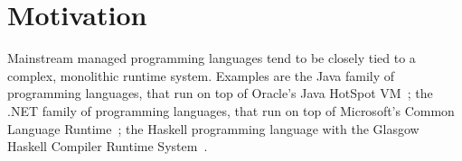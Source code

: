 \documentclass[12pt,mscres,cdtppar,twoside,openright,logo,rightchapter,normalheadings]{infthesis}
\theoremstyle{definition}
\begin{document}





\section{Motivation}
\label{sec:motivation}

Mainstream managed programming languages tend to be closely tied to a
complex, monolithic runtime system. Examples are the Java family of
programming languages, that run on top of Oracle's Java HotSpot
VM~\citep{HotSpot2016}; the .NET family of programming languages, that
run on top of Microsoft's Common Language Runtime~\citep{CLR2016}; the
Haskell programming language with the Glasgow Haskell Compiler Runtime
System~\citep{GHC2014}.
\end{document}
